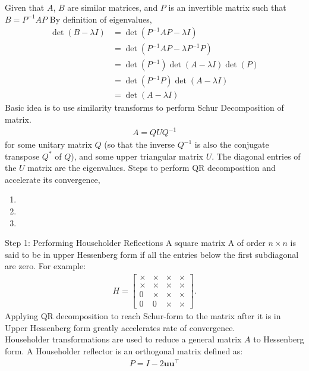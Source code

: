 \documentclass[journal]{IEEEtran}
\begin{document}
Given that $A$, $B$ are similar matrices, and $P$ is an invertible matrix such that $B=P^{-1}AP$
By definition of eigenvalues,
\begin{align}
    \det(B-\lambda I)&=\det(P^{-1}AP -\lambda I)\\
    &=\det(P^{-1}AP -\lambda P^{-1}P)\\
    &=\det(P^{-1})\det(A-\lambda I)\det(P)\\
    &=\det(P^{-1}P)\det(A- \lambda I)\\
    &=\det(A-\lambda I)
\end{align}
Basic idea is to use similarity transforms to perform Schur Decomposition of matrix.
\begin{align}
  A = QUQ^{-1}
\end{align}
for some unitary matrix $Q$ (so that the inverse $Q^{-1}$ is also the conjugate transpose $Q^*$ 
of $Q$), and some upper triangular matrix $U$. The diagonal entries of the $U$ matrix are 
the eigenvalues. \newline
Steps to perform QR decomposition and accelerate its convergence,
\begin{enumerate}
\item {}
\item {}
\item {}
\end{enumerate}
Step 1: Performing Householder Reflections\newline
A square matrix A of order $n \times n$ is said to be in upper Hessenberg form if all the entries below the first subdiagonal are zero.
For example:
\begin{align}
H = \begin{bmatrix}
\times & \times & \times & \times \\
\times & \times & \times & \times \\
0 & \times & \times & \times \\
0 & 0 & \times & \times
\end{bmatrix}.
\end{align}
Applying QR decomposition to reach Schur-form to the matrix after it is in Upper Hessenberg form greatly accelerates rate of convergence.\\
Householder transformations are used to reduce a general matrix $A$ to Hessenberg form. A Householder reflector is an orthogonal matrix defined as:
\begin{align}
P = I - 2\textbf{uu}^{\top} \\
\end{align}
\end{document}

